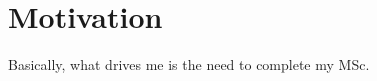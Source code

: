\section{Motivation}
\label{sec:int_motivation}

Basically, what drives me is the need to complete my MSc.